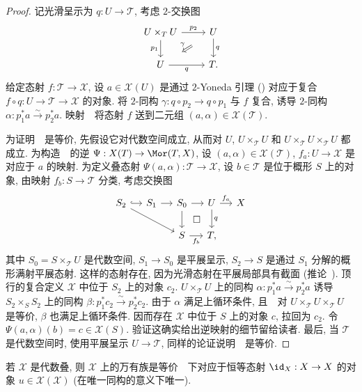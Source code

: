 \begin{proof}
记光滑呈示为 $q:U\to\mathcal T$, 考虑 $2$-交换图
\[
\begin{tikzcd}
U\times_{\mathcal T}U\arrow[r,"p_2"]\arrow[d,"p_1"']&U\arrow[d,"q"]\\
U\arrow[r,"q"']&\mathcal T.
\arrow[Rightarrow,from=1-2,to=2-1,shorten <=1.6em,shorten >=1.6em,"\gamma"']
\end{tikzcd}
\]
给定态射 $f:\mathcal T\to\mathcal X$, 设 $a\in\mathcal X(U)$ 是通过 $2$-Yoneda 引理 () 对应于复合 $f\circ q:U\to\mathcal T\to\mathcal X$ 的对象.
将 $2$-同构 $\gamma:q\circ p_2\to q\circ p_1$ 与 $f$ 复合, 诱导 $2$-同构 $\alpha:p_1^*a\xrightarrow{\sim}p_2^*a$.
映射~~将态射 $f$ 送到二元组 $(a,\alpha)\in\mathcal X(\mathcal T)$.

为证明~~是等价, 先假设它对代数空间成立, 从而对 $U$, $U\times_{\mathcal T}U$ 和 $U\times_{\mathcal T}U\times_{\mathcal T}U$ 都成立.
为构造~~的逆 $\Psi:\mathcal X(\mathcal T)\to\Mor(\mathcal T,\mathcal X)$, 设 $(a,\alpha)\in\mathcal X(\mathcal T)$, $f_a:U\to\mathcal X$ 是对应于 $a$ 的映射.
为定义叠态射 $\Psi(a,\alpha):\mathcal T\to\mathcal X$, 设 $b\in\mathcal T$ 是位于概形 $S$ 上的对象, 由映射 $f_b:S\to\mathcal T$ 分类, 考虑交换图
\[
\begin{tikzcd}[column sep=small]
S_2\arrow[r,hook]\arrow[drr]&S_1\arrow[r]&S_0\arrow[r]\arrow[d]\arrow[dr,phantom,"\square"]&U\arrow[r,"f_a"]\arrow[d,"q"]&\mathcal X\\
{}&{}&S\arrow[r,"f_b"']&\mathcal T,&{}
\end{tikzcd}
\]
其中 $S_0=S\times_{\mathcal T}U$ 是代数空间, $S_1\to S_0$ 是平展呈示, $S_2\to S$ 是通过 $S_1$ 分解的概形满射平展态射. 这样的态射存在, 因为光滑态射在平展局部具有截面 (推论~).
顶行的复合定义 $\mathcal X$ 中位于 $S_2$ 上的对象 $c_2$.
$U\times_{\mathcal T}U$ 上的同构 $\alpha:p_1^*a\xrightarrow{\sim}p_2^*a$ 诱导 $S_2\times_S S_2$ 上的同构 $\beta:p_1^*c_2\xrightarrow{\sim}p_2^*c_2$.
由于 $\alpha$ 满足上循环条件, 且~~对 $U\times_{\mathcal T}U\times_{\mathcal T}U$ 是等价, $\beta$ 也满足上循环条件. 因而存在 $\mathcal X$ 中位于 $S$ 上的对象 $c$, 拉回为 $c_2$.
令 $\Psi(a,\alpha)(b)=c\in\mathcal X(S)$. 验证这确实给出逆映射的细节留给读者.
最后, 当 $\mathcal T$ 是代数空间时, 使用平展呈示 $U\to\mathcal T$, 同样的论证说明~~是等价.
\end{proof}
\begin{definition}[万有族]\label{src:4.1.29}
若 $\mathcal X$ 是代数叠, 则 $\mathcal X$ 上的万有族是等价~~下对应于恒等态射 $\id_{\mathcal X}:\mathcal X\to\mathcal X$ 的对象 $u\in\mathcal X(\mathcal X)$ (在唯一同构的意义下唯一).
\end{definition}
